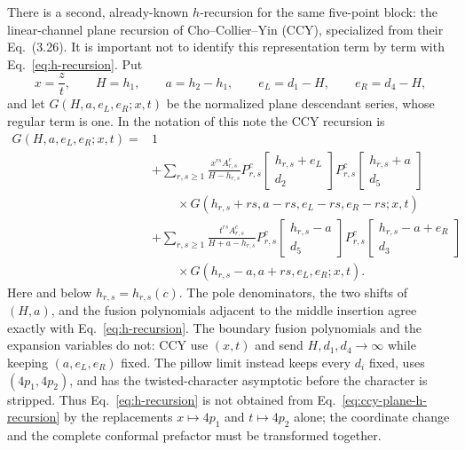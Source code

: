 \documentclass[11pt]{article}
\begin{document}
There is a second, already-known $h$-recursion for the same five-point
block: the linear-channel plane recursion of Cho--Collier--Yin (CCY),
specialized from their Eq.~(3.26).  It is important not to identify this
representation term by term with Eq.~\eqref{eq:h-recursion}.  Put
\begin{equation}
 x=\frac{z}{t},\qquad H=h_1,\qquad a=h_2-h_1,\qquad
 e_L=d_1-H,\qquad e_R=d_4-H,
 \label{eq:ccy-plane-variables}
\end{equation}
and let $G(H,a,e_L,e_R;x,t)$ be the normalized plane descendant series,
whose regular term is one.  In the notation of this note the CCY recursion
is
\begin{equation}
\boxed{
\begin{aligned}
G(H,a,e_L,e_R;x,t)={}&1\\
&+\sum_{r,s\geq1}\frac{x^{rs}A_{r,s}^{c}}{H-h_{r,s}}
 P_{r,s}^{c}\!\begin{bmatrix}h_{r,s}+e_L\\d_2\end{bmatrix}
 P_{r,s}^{c}\!\begin{bmatrix}h_{r,s}+a\\d_5\end{bmatrix}\\[-2pt]
&\qquad\times
 G(h_{r,s}+rs,a-rs,e_L-rs,e_R-rs;x,t)\\
&+\sum_{r,s\geq1}\frac{t^{rs}A_{r,s}^{c}}{H+a-h_{r,s}}
 P_{r,s}^{c}\!\begin{bmatrix}h_{r,s}-a\\d_5\end{bmatrix}
 P_{r,s}^{c}\!\begin{bmatrix}h_{r,s}-a+e_R\\d_3\end{bmatrix}\\[-2pt]
&\qquad\times G(h_{r,s}-a,a+rs,e_L,e_R;x,t).
\end{aligned}}
\label{eq:ccy-plane-h-recursion}
\end{equation}
Here and below $h_{r,s}=h_{r,s}(c)$.  The pole denominators, the two
shifts of $(H,a)$, and the fusion polynomials adjacent to the middle
insertion agree exactly with Eq.~\eqref{eq:h-recursion}.  The boundary
fusion polynomials and the expansion variables do not: CCY use $(x,t)$
and send $H,d_1,d_4\to\infty$ while keeping $(a,e_L,e_R)$ fixed.  The
pillow limit instead keeps every $d_i$ fixed, uses $(4p_1,4p_2)$, and has
the twisted-character asymptotic before the character is stripped.  Thus
Eq.~\eqref{eq:h-recursion} is not obtained from
Eq.~\eqref{eq:ccy-plane-h-recursion} by the replacements
$x\mapsto4p_1$ and $t\mapsto4p_2$ alone; the coordinate change and the
complete conformal prefactor must be transformed together.
\end{document}
